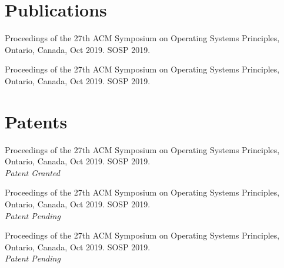 \documentclass[10pt]{article} %
\begin{document}

\section{Publications}

{
Proceedings of the 27th ACM
Symposium on Operating Systems Principles, Ontario, Canada, Oct 2019. SOSP 2019.
}


{
Proceedings of the 27th ACM
Symposium on Operating Systems Principles, Ontario, Canada, Oct 2019. SOSP 2019.
}



\section{Patents}

{
Proceedings of the 27th ACM
Symposium on Operating Systems Principles, Ontario, Canada, Oct 2019. SOSP 2019. \\ \textit{Patent Granted} 
}


{
Proceedings of the 27th ACM
Symposium on Operating Systems Principles, Ontario, Canada, Oct 2019. SOSP 2019.  \\ \textit{Patent Pending} 
}

{
Proceedings of the 27th ACM
Symposium on Operating Systems Principles, Ontario, Canada, Oct 2019. SOSP 2019.  \\ \textit{Patent Pending} 
}
\end{document}
